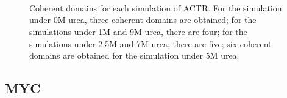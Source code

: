 \documentclass[12pt]{article}
\begin{document}
\begin{figure}[htbp]
  \addtocounter{subfigure}{3}
  \\
  \\
  \\
  \caption{\label{ACTR}Coherent domains for each simulation of ACTR. For the simulation under 0M urea, three coherent domains are obtained; for the simulations under 1M and 9M urea, there are four; for the simulations under 2.5M and 7M urea, there are five; six coherent domains are obtained for the simulation under 5M urea.}
\end{figure}

\clearpage

\subsection*{MYC}
\end{document}
